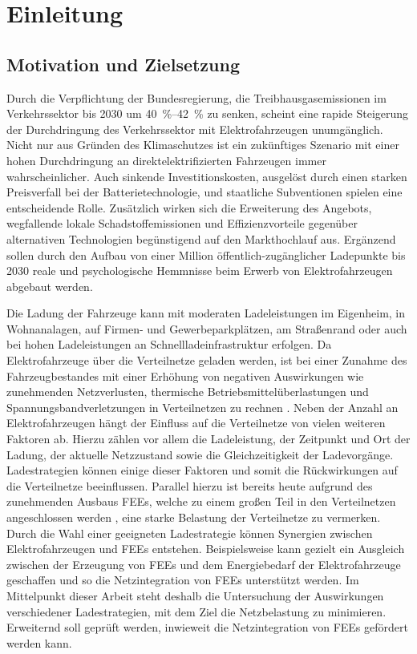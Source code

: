 \section{Einleitung}


\subsection{Motivation und Zielsetzung}

Durch die Verpflichtung der Bundesregierung, die Treibhausgasemissionen im Verkehrssektor bis \num{2030} um \SIrange[range-phrase=~bis~]{40}{42}{\percent} \cite{BundesministeriumUmwelt2019} zu senken, scheint eine rapide Steigerung der Durchdringung des Verkehrssektor mit Elektrofahrzeugen unumgänglich.
Nicht nur aus Gründen des Klimaschutzes ist ein zukünftiges Szenario mit einer hohen Durchdringung an direktelektrifizierten Fahrzeugen immer wahrscheinlicher.
Auch sinkende Investitionskosten, ausgelöst durch einen starken Preisverfall bei der Batterietechnologie, und staatliche Subventionen spielen eine entscheidende Rolle.
Zusätzlich wirken sich die Erweiterung des Angebots, wegfallende lokale Schadstoffemissionen und Effizienzvorteile gegenüber alternativen Technologien begünstigend auf den Markthochlauf aus.
Ergänzend sollen durch den Aufbau von einer Million öffentlich-zugänglicher Ladepunkte bis \num{2030} \cite{DieBundesregierung2019} reale und psychologische Hemmnisse beim Erwerb von Elektrofahrzeugen abgebaut werden.\medskip

Die Ladung der Fahrzeuge kann mit moderaten Ladeleistungen im Eigenheim, in Wohnanalagen, auf Firmen- und Gewerbeparkplätzen, am Straßenrand oder auch bei hohen Ladeleistungen an Schnellladeinfrastruktur erfolgen.
Da Elektrofahrzeuge über die Verteilnetze geladen werden, ist bei einer Zunahme des Fahrzeugbestandes mit einer Erhöhung von negativen Auswirkungen wie zunehmenden Netzverlusten, thermische Betriebsmittelüberlastungen und Spannungsbandverletzungen in Verteilnetzen zu rechnen \cite{Dharmakeerthi2011}.
Neben der Anzahl an Elektrofahrzeugen hängt der Einfluss auf die Verteilnetze von vielen weiteren Faktoren ab.
Hierzu zählen vor allem die Ladeleistung, der Zeitpunkt und Ort der Ladung, der aktuelle Netzzustand sowie die Gleichzeitigkeit der Ladevorgänge.
Ladestrategien können einige dieser Faktoren und somit die Rückwirkungen auf die Verteilnetze beeinflussen.
Parallel hierzu ist bereits heute aufgrund des zunehmenden Ausbaus \glspl{FEE}, welche zu einem großen Teil in den Verteilnetzen angeschlossen werden \cite{AgoraEnergiewende2017}, eine starke Belastung der Verteilnetze zu vermerken.
Durch die Wahl einer geeigneten Ladestrategie können Synergien zwischen Elektrofahrzeugen und \glspl{FEE} entstehen.
Beispielsweise kann gezielt ein Ausgleich zwischen der Erzeugung von \glspl{FEE} und dem Energiebedarf der Elektrofahrzeuge geschaffen und so die Netzintegration von \glspl{FEE} unterstützt werden.
Im Mittelpunkt dieser Arbeit steht deshalb die Untersuchung der Auswirkungen verschiedener Ladestrategien, mit dem Ziel die Netzbelastung zu minimieren.
Erweiternd soll geprüft werden, inwieweit die Netzintegration von \glspl{FEE} gefördert werden kann.\medskip

